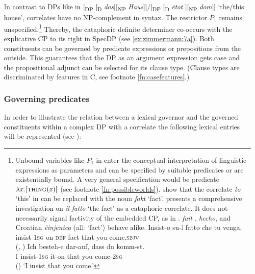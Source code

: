 \documentclass[output=paper]{langscibook}
\begin{document}
In contrast to DPs like in [\textsubscript{DP} [\textsubscript{D} \textit{das}][\textsubscript{NP} \textit{Haus}]]/[\textsubscript{DP} [\textsubscript{D} \textit{ėtot} ][\textsubscript{NP} \textit{dom}]] `the/this house', correlates have no NP-complement in syntax. The restrictor $P_1$ remains unspecified.\footnote{Unbound variables like $P_1$ in  enter the conceptual interpretation of linguistic expressions as parameters and can be specified by suitable predicates or are existentially bound. A very general specification would be  predicate $\lambda x.[\textsc{thing} (x)]$ (see footnote \ref{fn:possibleworlds}). \citet[67]{BondarukRozwadowskaWitkowski2017} show that the correlate \textit{to} `this' in  can be replaced with the noun \textit{fakt} `fact'. \citet[2.4]{Mollica2010} presents a comprehensive investigation on  \textit{il fatto} `the fact' as a cataphoric correlate. It does not necessarily signal factivity of the embedded CP, as in .  \textit{fait} ,  \textit{hecho}, and Croatian \textit{činjenica} (all: `fact') behave alike.
        \ea\label{ex:zimmermann:Italian1}
        \ea\gll Insist-o su-l fatto che tu venga.\\
        insist-\textsc{1sg} on-\textsc{def} fact that you come.\textsc{sbjv}\\ \hfill (, \citealt[240]{Mollica2010})
        \ex
        \gll Ich besteh-e dar-auf, dass du komm-st.\\
        I insist-\textsc{1sg} {it-on} that you come-\textsc{2sg}\\ \hfill ()
        \z
        \glt `I insist that you come.'
        \z
} Thereby, the cataphoric definite determiner co-occurs with the explicative CP to its right in SpecDP (see \ref{ex:zimmermann:7a}). Both constituents can be governed by predicate expressions or prepositions from the outside. This guarantees that the DP as an argument expression gets case and the propositional adjunct can be selected for its clause type. (Clause types are discriminated by features in C, see footnote \ref{fn:casefeatures}.)


\subsubsection{Governing predicates}\label{s:2.3.2}

In order to illustrate the relation between a lexical governor and the governed constituents within a complex DP with a correlate the following lexical entries will be represented (see \citealt[42--45]{Zimmermann2016a}):
\end{document}
